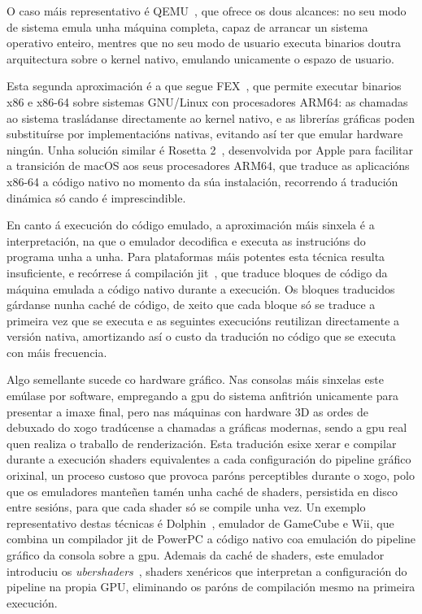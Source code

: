 O caso máis representativo é QEMU~\cite{qemu},
que ofrece os dous alcances: no seu modo de sistema emula unha máquina completa,
capaz de arrancar un sistema operativo enteiro,
mentres que no seu modo de usuario executa binarios doutra arquitectura
sobre o kernel nativo, emulando unicamente o espazo de usuario.

Esta segunda aproximación é a que segue FEX~\cite{Fexemu},
que permite executar binarios x86 e x86-64 sobre sistemas GNU/Linux con procesadores ARM64:
as chamadas ao sistema trasládanse directamente ao kernel nativo,
e as librerías gráficas poden substituírse por implementacións nativas,
evitando así ter que emular hardware ningún.
Unha solución similar é Rosetta 2~\cite{Rosetta2},
desenvolvida por Apple para facilitar a transición de macOS aos seus procesadores ARM64,
que traduce as aplicacións x86-64 a código nativo no momento da súa instalación,
recorrendo á tradución dinámica só cando é imprescindible.

En canto á execución do código emulado, a aproximación máis sinxela é a interpretación,
na que o emulador decodifica e executa as instrucións do programa unha a unha.
Para plataformas máis potentes esta técnica resulta insuficiente,
e recórrese á compilación \acrfull{jit}~\cite{Jit},
que traduce bloques de código da máquina emulada a código nativo durante a execución.
Os bloques traducidos gárdanse nunha caché de código,
de xeito que cada bloque só se traduce a primeira vez que se executa
e as seguintes execucións reutilizan directamente a versión nativa,
amortizando así o custo da tradución no código que se executa con máis frecuencia.

Algo semellante sucede co hardware gráfico.
Nas consolas máis sinxelas este emúlase por software,
empregando a \acrfull{gpu} do sistema anfitrión unicamente para presentar a imaxe final,
pero nas máquinas con hardware 3D as ordes de debuxado do xogo
tradúcense a chamadas a  gráficas modernas,
sendo a \acrshort{gpu} real quen realiza o traballo de renderización.
Esta tradución esixe xerar e compilar durante a execución shaders equivalentes
a cada configuración do pipeline gráfico orixinal,
un proceso custoso que provoca paróns perceptibles durante o xogo,
polo que os emuladores manteñen tamén unha caché de shaders,
persistida en disco entre sesións, para que cada shader só se compile unha vez.
Un exemplo representativo destas técnicas é Dolphin~\cite{Dolphin},
emulador de GameCube e Wii, que combina un compilador \acrshort{jit} de PowerPC a código nativo
coa emulación do pipeline gráfico da consola sobre a \acrshort{gpu}.
Ademais da caché de shaders, este emulador introduciu os \textit{ubershaders}~\cite{DolphinUbershaders},
shaders xenéricos que interpretan a configuración do pipeline na propia GPU,
eliminando os paróns de compilación mesmo na primeira execución.

